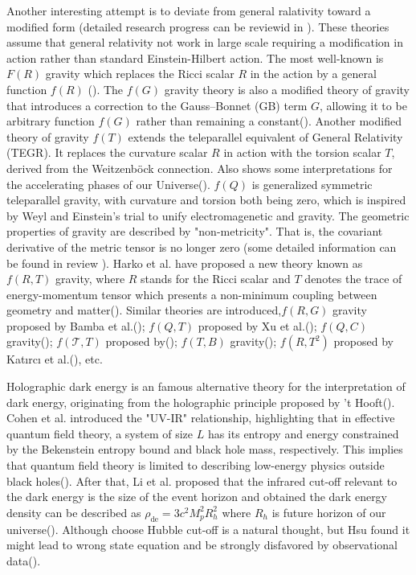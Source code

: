 \documentclass[manuscript]{aastex631}
\begin{document}
Another interesting attempt is to deviate from general ralativity toward a modified form (detailed research progress can be reviewid in \cite{Clifton_2012}). These theories assume that general relativity not work in large scale requiring a modification in action rather than standard Einstein-Hilbert action. The most well-known is $F(R)$ gravity which replaces the Ricci scalar $R$ in the action by a general function $f(R)$ (\cite{1970MNRAS.150....1B}). The $f(G)$ gravity theory is also a modified theory of gravity that introduces a correction to the Gauss–Bonnet (GB) term $G$, allowing it to be arbitrary function $f(G)$ rather than remaining a constant(\cite{NOJIRI20051,NOJIRI_2007}). Another modified theory of gravity $f(T)$ extends the teleparallel equivalent of General Relativity (TEGR). It replaces the curvature scalar $R$ in action with the torsion scalar $T$, derived from the Weitzenböck connection. Also shows some interpretations for the accelerating phases of our Universe(\cite{Cai_2016,Bengochea_2009}). $f(Q)$ is generalized symmetric teleparallel gravity, with curvature and torsion both being zero, which is inspired by Weyl and Einstein's trial to unify electromagenetic and gravity. The geometric properties of gravity are described by "non-metricity". That is, the covariant derivative of the metric tensor is no longer zero (some detailed information can be found in review \cite{HEISENBERG20241}). Harko et al. have proposed a new theory known as $f (R, T )$ gravity, where $R$ stands for the Ricci scalar and $T$ denotes the trace of energy-momentum tensor which presents a non-minimum coupling between geometry and matter(\cite{PhysRevD.84.024020}). Similar theories are introduced,$f(R,G)$ gravity proposed by Bamba et al.(\cite{Bamba2009FinitetimeFS}); $f(Q,T)$ proposed by Xu et al.(\cite{Xu_2019}); $f(Q,C)$ gravity(\cite{De_2024}); $f(\mathcal{T},T)$ proposed by(\cite{Harko_2014}); $f(T,B)$ gravity(\cite{Bahamonde_2015,Bahamonde_2017}); $f(R,T^2)$ proposed by Katırcı et al.(\cite{Kat_rc__2014}), etc.

Holographic dark energy is an famous alternative theory for the interpretation of dark energy, originating from the holographic principle proposed by ’t Hooft(\cite{hooft2009dimensionalreductionquantumgravity}). Cohen et al. introduced the "UV-IR" relationship, highlighting that in effective quantum field theory, a system of size $L$ has its entropy and energy constrained by the Bekenstein entropy bound and black hole mass, respectively. This implies that quantum field theory is limited to describing low-energy physics outside black holes(\cite{cohen_effective_1999}). After that, Li et al. proposed that the infrared cut-off relevant to the dark energy is the size of the event horizon and obtained the dark energy density can be described as $\rho_\text{de}=3c^2 M_p^2 R_h^2$ where $R_h$ is future horizon of our universe(\cite{LI20041}). Although choose Hubble cut-off is a natural thought, but Hsu found it might lead to wrong state equation and be strongly disfavored by observational data(\cite{Hsu_2004}).
\end{document}
